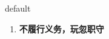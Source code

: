 
\begin{frame}
{\huge default}
\begin{center}
\begin{enumerate}\Large
  \item \textbf{不履行义务，玩忽职守}
\end{enumerate}
\end{center}
\end{frame}
